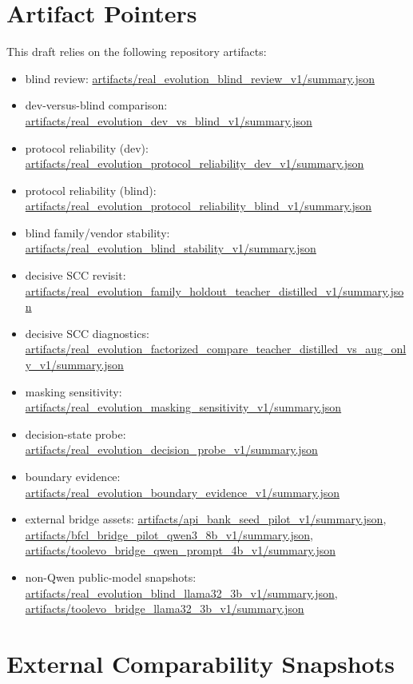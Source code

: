 \section{Artifact Pointers}
\label{app:artifacts}

This draft relies on the following repository artifacts:
\begin{itemize}[leftmargin=1.5em]
    \item blind review: \url{artifacts/real_evolution_blind_review_v1/summary.json}
    \item dev-versus-blind comparison: \url{artifacts/real_evolution_dev_vs_blind_v1/summary.json}
    \item protocol reliability (dev): \url{artifacts/real_evolution_protocol_reliability_dev_v1/summary.json}
    \item protocol reliability (blind): \url{artifacts/real_evolution_protocol_reliability_blind_v1/summary.json}
    \item blind family/vendor stability: \url{artifacts/real_evolution_blind_stability_v1/summary.json}
    \item decisive SCC revisit: \url{artifacts/real_evolution_family_holdout_teacher_distilled_v1/summary.json}
    \item decisive SCC diagnostics: \url{artifacts/real_evolution_factorized_compare_teacher_distilled_vs_aug_only_v1/summary.json}
    \item masking sensitivity: \url{artifacts/real_evolution_masking_sensitivity_v1/summary.json}
    \item decision-state probe: \url{artifacts/real_evolution_decision_probe_v1/summary.json}
    \item boundary evidence: \url{artifacts/real_evolution_boundary_evidence_v1/summary.json}
    \item external bridge assets: \url{artifacts/api_bank_seed_pilot_v1/summary.json}, \url{artifacts/bfcl_bridge_pilot_qwen3_8b_v1/summary.json}, \url{artifacts/toolevo_bridge_qwen_prompt_4b_v1/summary.json}
    \item non-Qwen public-model snapshots: \url{artifacts/real_evolution_blind_llama32_3b_v1/summary.json}, \url{artifacts/toolevo_bridge_llama32_3b_v1/summary.json}
\end{itemize}

\section{External Comparability Snapshots}

